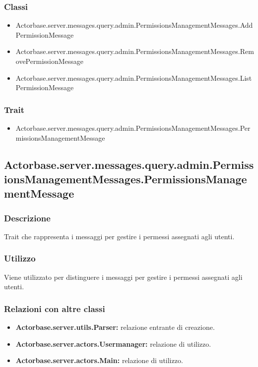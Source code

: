 \documentclass[a4paper]{article}
\begin{document}
			\subsubsection{Classi}
				\begin{itemize}
					\item Actorbase.server.messages.query.admin.PermissionsManagementMessages.AddPermissionMessage
					\item Actorbase.server.messages.query.admin.PermissionsManagementMessages.RemovePermissionMessage
					\item Actorbase.server.messages.query.admin.PermissionsManagementMessages.ListPermissionMessage
				\end{itemize}
				
			\subsubsection{Trait}
				\begin{itemize}
					\item Actorbase.server.messages.query.admin.PermissionsManagementMessages.PermissionsManagementMessage
				\end{itemize}
		
		\subsection{Actorbase.server.messages.query.admin.PermissionsManagementMessages.PermissionsManagementMessage}
			\subsubsection{Descrizione}
				Trait che rappresenta i messaggi per gestire i permessi assegnati agli utenti.
				
			\subsubsection{Utilizzo}
				Viene utilizzato per distinguere i messaggi per gestire i permessi assegnati agli utenti.
			\subsubsection{Relazioni con altre classi}
				\begin{itemize}
					\item \textbf{Actorbase.server.utils.Parser:} relazione entrante di creazione.
					\item \textbf{Actorbase.server.actors.Usermanager:} relazione di utilizzo.
					\item \textbf{Actorbase.server.actors.Main:} relazione di utilizzo.
				\end{itemize}
\end{document}
